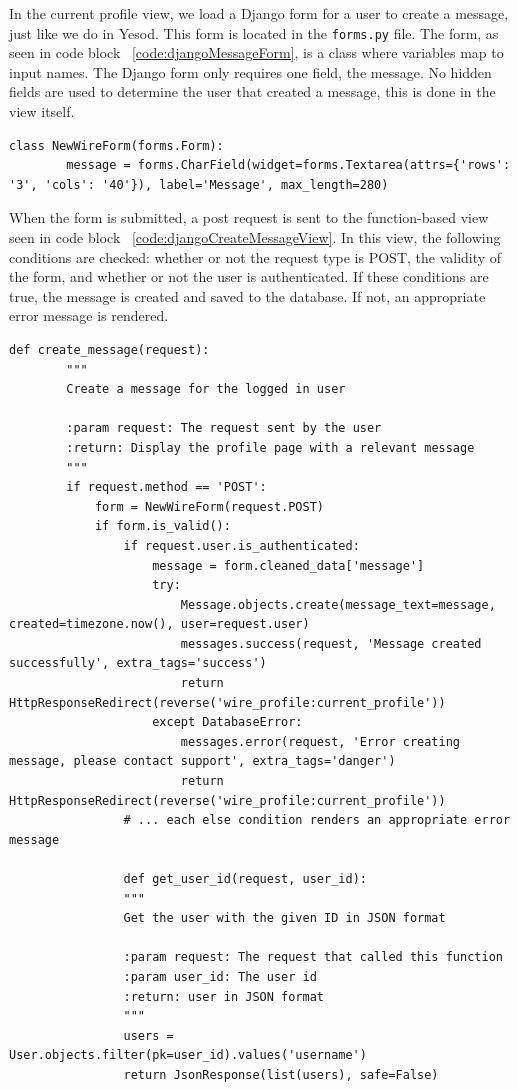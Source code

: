 In the current profile view, we load a Django form for a user to create a message,
just like we do in Yesod. This form is located in the \texttt{forms.py} file. The
form, as seen in code block ~\ref{code:djangoMessageForm}, is a class where variables map
to input names. The Django form only requires one field, the message. No hidden
fields are used to determine the user that created a message, this is done in
the view itself.

\begin{lstlisting}[caption={Django message form},label={code:djangoMessageForm}]
    class NewWireForm(forms.Form):
        message = forms.CharField(widget=forms.Textarea(attrs={'rows': '3', 'cols': '40'}), label='Message', max_length=280)
\end{lstlisting}

When the form is submitted, a post request is sent to the function-based view
seen in code block ~\ref{code:djangoCreateMessageView}. In this view, the following
conditions are checked: whether or not the request type is POST, the validity of the
form, and whether or not the user is authenticated. If these conditions are true,
the message is created and saved to the database. If not, an appropriate error
message is rendered.

\begin{lstlisting}[caption={Function-based create message view},label={code:djangoCreateMessageView}]
    def create_message(request):
        """
        Create a message for the logged in user

        :param request: The request sent by the user
        :return: Display the profile page with a relevant message
        """
        if request.method == 'POST':
            form = NewWireForm(request.POST)
            if form.is_valid():
                if request.user.is_authenticated:
                    message = form.cleaned_data['message']
                    try:
                        Message.objects.create(message_text=message, created=timezone.now(), user=request.user)
                        messages.success(request, 'Message created successfully', extra_tags='success')
                        return HttpResponseRedirect(reverse('wire_profile:current_profile'))
                    except DatabaseError:
                        messages.error(request, 'Error creating message, please contact support', extra_tags='danger')
                        return HttpResponseRedirect(reverse('wire_profile:current_profile'))
                # ... each else condition renders an appropriate error message

                def get_user_id(request, user_id):
                """
                Get the user with the given ID in JSON format
            
                :param request: The request that called this function
                :param user_id: The user id
                :return: user in JSON format
                """
                users = User.objects.filter(pk=user_id).values('username')
                return JsonResponse(list(users), safe=False)
\end{lstlisting}

